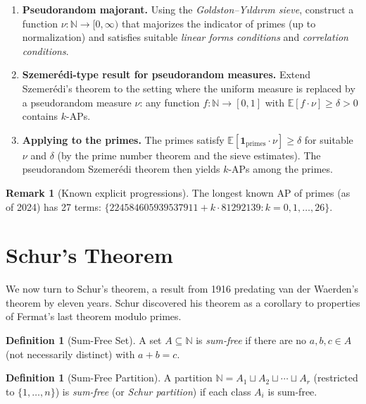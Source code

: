 \documentclass[12pt,a4paper]{amsart}
\theoremstyle{definition}
\newtheorem{definition}[theorem]{Definition}
\newtheorem{remark}[theorem]{Remark}
\newcommand{\N}{\mathbb{N}}
\begin{document}
\begin{enumerate}[label=(\roman*)]
\item \textbf{Pseudorandom majorant.} Using the \emph{Goldston--Y\i ld\i r\i m sieve},
  construct a function $\nu: \N \to [0,\infty)$ that majorizes the indicator of
  primes (up to normalization) and satisfies suitable \emph{linear forms conditions}
  and \emph{correlation conditions}.

\item \textbf{Szemer\'edi-type result for pseudorandom measures.}
  Extend Szemer\'edi's theorem to the setting where the uniform measure is replaced
  by a pseudorandom measure $\nu$: any function $f: \N \to [0,1]$ with
  $\mathbb{E}[f \cdot \nu] \geq \delta > 0$ contains $k$-APs.

\item \textbf{Applying to the primes.}
  The primes satisfy $\mathbb{E}[\mathbf{1}_{\mathrm{primes}} \cdot \nu] \geq \delta$
  for suitable $\nu$ and $\delta$ (by the prime number theorem and the sieve estimates).
  The pseudorandom Szemer\'edi theorem then yields $k$-APs among the primes.
\end{enumerate}

\begin{remark}[Known explicit progressions]
The longest known AP of primes (as of 2024) has 27 terms:
$\{224584605939537911 + k \cdot 81292139 : k = 0, 1, \ldots, 26\}$.
\end{remark}

\section{Schur's Theorem}\label{sec:schur}

We now turn to Schur's theorem, a result from 1916 predating van der Waerden's theorem
by eleven years. Schur discovered his theorem as a corollary to properties of Fermat's
last theorem modulo primes.

\begin{definition}[Sum-Free Set]
A set $A \subseteq \N$ is \emph{sum-free} if there are no $a, b, c \in A$ (not
necessarily distinct) with $a + b = c$.
\end{definition}

\begin{definition}[Sum-Free Partition]
A partition $\N = A_1 \sqcup A_2 \sqcup \cdots \sqcup A_r$ (restricted to
$\{1, \ldots, n\}$) is \emph{sum-free} (or \emph{Schur partition}) if each class
$A_i$ is sum-free.
\end{definition}
\end{document}
